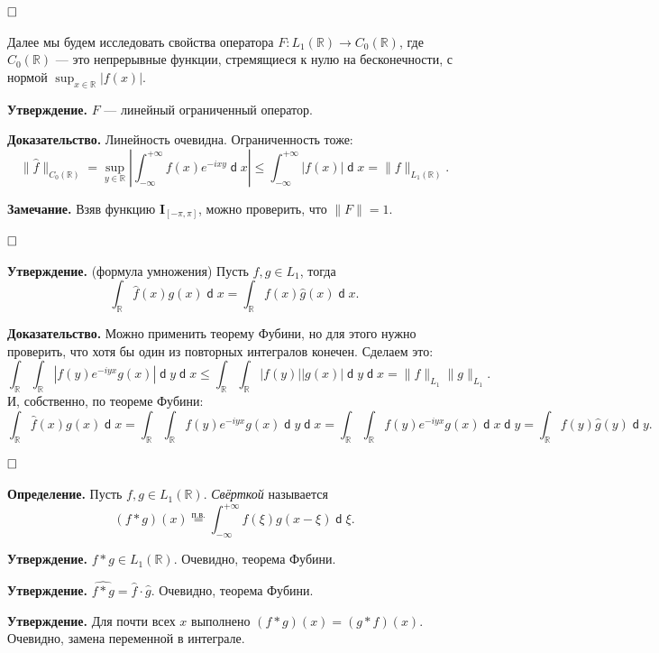 \documentclass[12pt, a4paper]{article}
\DeclareMathOperator{\dif}{\mathsf{d}}
\newcommand{\QED}{$\hfill\square$}
\renewcommand{\le}{\leqslant}  %
\begin{document}
\QED

Далее мы будем исследовать свойства оператора $F: L_1(\mathbb R) \to C_0(\mathbb R)$, где $C_0(\mathbb R)$ --- это непрерывные функции, стремящиеся к нулю на бесконечности, с нормой $\sup_{x \in \mathbb R} |f(x)|$.

\textbf{Утверждение.}
$F$ --- линейный ограниченный оператор. 

\textbf{Доказательство.} Линейность очевидна. Ограниченность тоже:
\[
    \|\hat f\|_{C_0(\mathbb R)} = \sup_{y \in \mathbb R} \left|\int_{-\infty}^{+\infty} f(x) e^{-ixy} \dif x\right| \le \int_{-\infty}^{+\infty} |f(x)| \dif x = \|f\|_{L_1(\mathbb R)}.
\]

\textbf{Замечание.} Взяв функцию $\mathbf I_{[-\pi, \pi]}$, можно проверить, что $\|F\| = 1$.

\QED

\textbf{Утверждение.} (формула умножения) Пусть $f, g \in L_1$, тогда
\[
    \int_{\mathbb R} \hat f(x) g(x) \dif x = \int_{\mathbb R} f(x) \hat g(x) \dif x.
\]

\textbf{Доказательство.} Можно применить теорему Фубини, но для этого нужно проверить, что хотя бы один из повторных интегралов конечен. Сделаем это:
\[
    \int_{\mathbb R} \int_{\mathbb R} |f(y)e^{-iyx} g(x)| \dif y \dif x \le \int_{\mathbb R} \int_{\mathbb R} |f(y)||g(x)| \dif y \dif x = \|f\|_{L_1} \|g\|_{L_1}.
\]
И, собственно, по теореме Фубини:
\[
    \int_{\mathbb R} \hat f(x) g(x) \dif x = \int_{\mathbb R} \int_{\mathbb R} f(y)e^{-iyx} g(x) \dif y \dif x =  \int_{\mathbb R} \int_{\mathbb R} f(y)e^{-iyx} g(x) \dif x \dif y = \int_{\mathbb R} f(y) \hat g(y) \dif y.
\]

\QED

\textbf{Определение.} Пусть $f, g \in L_1(\mathbb R)$. \textit{Свёрткой} называется
\[
    (f * g)(x) \overset{\text{п.в.}}{=} \int_{-\infty}^{+\infty} f(\xi) g(x - \xi) \dif \xi.
\]

\textbf{Утверждение.} $f * g \in L_1(\mathbb R)$.
Очевидно, теорема Фубини.

\textbf{Утверждение.} $\widehat{f * g} = \hat f \cdot \hat g$.
Очевидно, теорема Фубини.

\textbf{Утверждение.} Для почти всех $x$ выполнено $(f * g)(x) = (g * f)(x)$.
Очевидно, замена переменной в интеграле.
\end{document}
